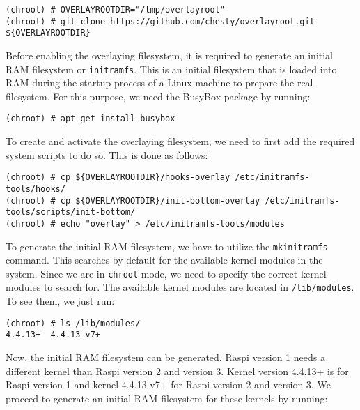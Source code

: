 \begin{lstlisting}[]
(chroot) # OVERLAYROOTDIR="/tmp/overlayroot"
(chroot) # git clone https://github.com/chesty/overlayroot.git ${OVERLAYROOTDIR}
\end{lstlisting}
\FloatBarrier
\vspace{-5mm}

Before enabling the overlaying filesystem, it is required to generate
an initial \ac{RAM} filesystem or \texttt{initramfs}. This is an
initial filesystem that is loaded into \ac{RAM} during the startup
process of a Linux machine to prepare the real filesystem. For this purpose,
we need the BusyBox package by running:

\begin{lstlisting}[]
(chroot) # apt-get install busybox
\end{lstlisting}
\FloatBarrier
\vspace{-5mm}

To create and activate the overlaying filesystem, we need to first
add the required system scripts to do so. This is done as follows:

\begin{lstlisting}[]
(chroot) # cp ${OVERLAYROOTDIR}/hooks-overlay /etc/initramfs-tools/hooks/
(chroot) # cp ${OVERLAYROOTDIR}/init-bottom-overlay /etc/initramfs-tools/scripts/init-bottom/
(chroot) # echo "overlay" > /etc/initramfs-tools/modules
\end{lstlisting}
\FloatBarrier
\vspace{-5mm}

To generate the initial \ac{RAM} filesystem, we have to utilize the
\texttt{mkinitramfs} command. This searches by default for the available
kernel modules in the system. Since we are in \texttt{chroot} mode, we need
to specify the correct kernel modules to search for. The available
kernel modules are located in \texttt{/lib/modules}.
To see them, we just run:

\begin{lstlisting}[]
(chroot) # ls /lib/modules/
4.4.13+  4.4.13-v7+
\end{lstlisting}
\FloatBarrier
\vspace{-5mm}

Now, the initial \ac{RAM} filesystem can be generated. \ac{Raspi} version 1
needs a different kernel than \ac{Raspi} version 2 and version 3. Kernel
version 4.4.13+ is for \ac{Raspi} version 1 and kernel 4.4.13-v7+ for
\ac{Raspi} version 2 and version 3. We proceed to generate an initial
\ac{RAM} filesystem for these kernels by running:


